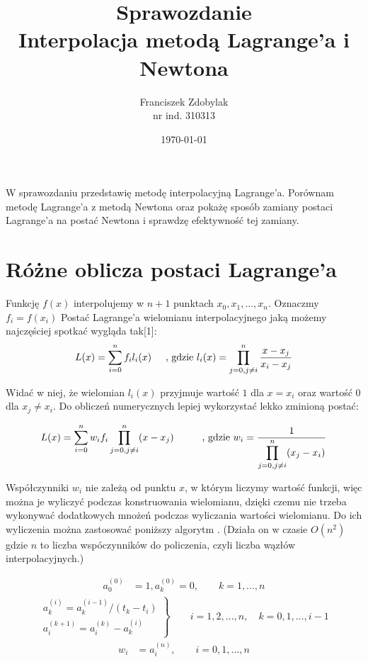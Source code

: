 \documentclass[a4paper]{article}
\author{Franciszek Zdobylak \\ \small{nr ind. 310313}}
\title{\LARGE{Sprawozdanie} \\ \normalsize{Interpolacja metodą Lagrange'a i Newtona}}
\date{\today}
\begin{document}
\maketitle
\abstract
W sprawozdaniu przedstawię metodę interpolacyjną Lagrange'a.
Porównam metodę Lagrange'a z metodą Newtona oraz pokażę sposób zamiany postaci
Lagrange'a na postać Newtona i sprawdzę efektywność tej zamiany.

\section{Różne oblicza postaci Lagrange'a}

Funkcję $f(x)$ interpolujemy w $n+1$ punktach $x_0, x_1, ..., x_n$. Oznaczmy $f_i = f(x_i)$
Postać Lagrange'a wielomianu interpolacyjnego jaką możemy najczęściej spotkać
wygląda tak[1]:
$$ L(x) = \sum_{i=0}^{n} f_i l_i(x) 
\text{\hspace{0.5cm}, gdzie } 
l_i(x) = \prod_{j=0,j\neq i}^n \frac{x - x_j}{x_i - x_j}$$

Widać w niej, że wielomian $ l_i(x) $ przyjmuje wartość $ 1 $ dla $ x = x_i $
oraz wartość $ 0 $ dla $ x_j \neq x_i $. Do obliczeń numerycznych lepiej
wykorzystać lekko zminioną postać:

$$ L(x) = \sum_{i=0}^n w_if_i \prod_{j=0, j \neq i} ^n (x - x_j) 
\text{\hspace{1cm}, gdzie } w_i = \frac{1}{\displaystyle\prod_{j=0, j\neq i}^{n}(x_j - x_i)}$$

Współczynniki $w_i$ nie zależą od punktu $x$, w którym liczymy wartość funkcji, więc można je 
wyliczyć podczas konstruowania wielomianu, dzięki czemu nie trzeba wykonywać
dodatkowych mnożeń podczas wyliczania wartości wielomianu. Do ich wyliczenia można zastosować 
poniższy algorytm \cite{1}. (Działa on w czasie $O(n^2)$ gdzie $n$ to liczba wspóczynników 
do policzenia, czyli liczba wązłów interpolacyjnych.)

\begin{align*}
    a_0^{(0)} &= 1, a_k^{(0)} = 0, \qquad k = 1,...,n
\end{align*}
\begin{align*}
    \left. \begin{array}{l}
    a_k^{(i)} = a_k^{(i - 1)} / (t_k - t_i)\\
    a_i^{(k+1)} = a_i^{(k)} - a_k^{(i)}
  \end{array} 
  \right\} \qquad i = 1,2,...,n,\quad k = 0,1,...,i-1
\end{align*}
\begin{align*}
    w_i  &= a_i^{(n)}, \qquad i = 0,1,...,n
\end{align*}
\end{document}
